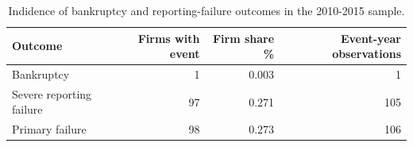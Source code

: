 \begin{table}
\caption{Indidence of bankruptcy and reporting-failure outcomes in the 2010-2015 sample.}
\label{tab:failure_incidence}
\begin{tabular}{lrrr}
\toprule
Outcome & Firms with event & Firm share \% & Event-year observations \\
\midrule
Bankruptcy & 1 & 0.003 & 1 \\
Severe reporting failure & 97 & 0.271 & 105 \\
Primary failure & 98 & 0.273 & 106 \\
\bottomrule
\end{tabular}
\end{table}
